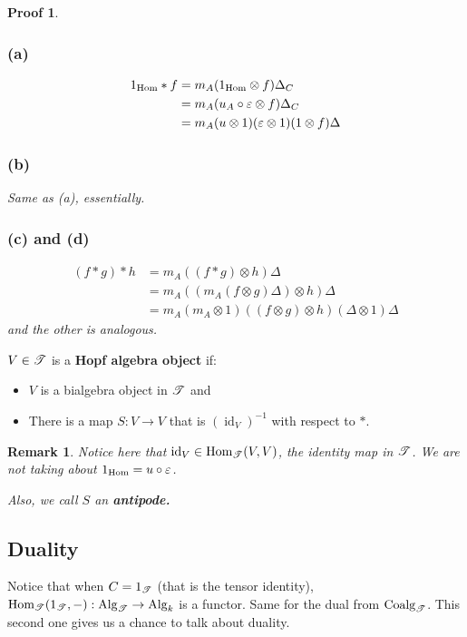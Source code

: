 \documentclass[12pt]{article}
\theoremstyle{break}
\theoremstyle{nonumberbreak}
\theoremstyle{changebreak}
\theoremstyle{break}
\theoremstyle{nonumberbreak}
\newtheorem{prf}{Proof}
\theoremstyle{nonumberplain}
\theoremstyle{change}
\newtheorem{rmk}[thm]{Remark}
\DeclareMathOperator{\id}{id}
\newcommand*{\Hom}{\ensuremath\text{Hom}}
\newcommand*{\Algk}{\operatorname{Alg}_k}
\DeclareMathOperator{\Coalg}{Coalg}
\DeclareMathOperator{\Alg}{Alg}
\newcommand*{\scrT}{\ensuremath\mathscr{T}}
\begin{document}
 \begin{prf}
	\subsubsection*{(a)}
	\begin{align*}
		1_{\Hom}\ast f&= m_A(1_{\Hom}\otimes f)\Delta_C\\
		&=m_A(u_A\circ\varepsilon\otimes f)\Delta_C\\
		&=m_A(u\otimes 1)(\varepsilon\otimes 1)(1\otimes f)\Delta
	\end{align*}
	\subsubsection*{(b)}
	Same as (a), essentially.
	\subsubsection*{(c) and (d)}
	\begin{align*}
		(f\ast g)\ast h&= m_A((f\ast g)\otimes h)\Delta\\
		&=m_A((m_A(f\otimes g)\Delta)\otimes h)\Delta\\
		&=m_A(m_A\otimes 1)((f\otimes g)\otimes h)(\Delta\otimes 1)\Delta
	\end{align*}
	and the other is analogous.
 \end{prf}

 \begin{defn}
	$V\in\scrT$ is a \textbf{Hopf algebra object} if:
	\begin{itemize}
		\item $V$ is a bialgebra object in $\scrT$ and
		\item There is a map $S:V\to V$ that is $(\id_V)^{-1}$ with respect to $\ast$.
	\end{itemize}
 \end{defn}
 \begin{rmk}
	Notice here that $\id_V\in\Hom_\scrT(V,V)$, the identity map in $\scrT$. We are \textit{not}
	taking about $1_{\Hom}=u\circ\varepsilon$.

	Also, we call $S$ an \textbf{antipode.}
 \end{rmk}

 \subsection{Duality}
 Notice that when $C=1_\scrT$ (that is the tensor identity), $\Hom_\scrT(1_\scrT,-):\Alg_\scrT\to\Algk$
 is a functor. Same for the dual from $\Coalg_\scrT$. This second one gives us a chance to talk about duality.
\end{document}
